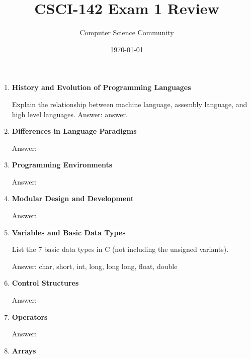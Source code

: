 \documentclass[11pt]{article}
\title{CSCI-142 Exam 1 Review}
\author{Computer Science Community}
\date{\today}
\newenvironment{answer}{\large\lstset{basicstyle=\tiny\ttfamily}\color{white} \small{Answer:}}{}
\newenvironment{answer}{\large\lstset{basicstyle=\large\ttfamily}\color{red} \small{Answer:}}{}
\begin{document}
\header
	\begin{enumerate}

\item \textbf{History and Evolution of Programming Languages}

Explain the relationship between machine language, assembly language, and high level languages.
\begin{answer}
answer.
\end{answer}



\item \textbf{Differences in Language Paradigms}

\begin{answer}
\end{answer}



\item \textbf{Programming Environments}

\begin{answer}
\end{answer}



\item \textbf{Modular Design and Development}

\begin{answer}
\end{answer}



\item \textbf{Variables and Basic Data Types}

List the 7 basic data types in C (not including the unsigned variants).

\begin{answer}
char, short, int, long, long long, float, double
\end{answer}



\item \textbf{Control Structures}

\begin{answer}
\end{answer}



\item \textbf{Operators}

\begin{answer}
\end{answer}



\item \textbf{Arrays}


\end{enumerate}
\end{document}
